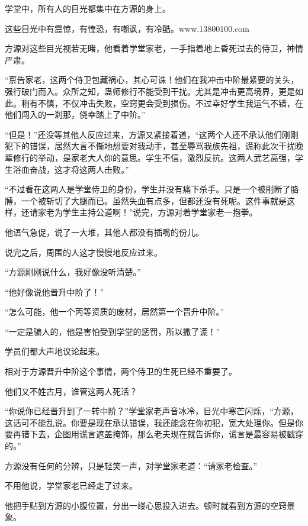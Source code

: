 
\begin{this_body}

学堂中，所有人的目光都集中在方源的身上。

这些目光中有震惊，有惶恐，有嘲讽，有冷酷。www.13800100.com

方源对这些目光视若无睹，他看着学堂家老，一手指着地上昏死过去的侍卫，神情严肃。

“禀告家老，这两个侍卫包藏祸心，其心可诛！他们在我冲击中阶最紧要的关头，强行破门而入。众所之知，蛊师修行不能受到干扰。尤其是冲击更高境界，更是如此。稍有不慎，不仅冲击失败，空窍更会受到损伤。不过幸好学生我运气不错，在他们闯入的一刹那，侥幸踏上了中阶。”

“但是！”还没等其他人反应过来，方源又紧接着道，“这两个人还不承认他们刚刚犯下的错误，居然大言不惭地想要对我动手，甚至辱骂我族先祖，谎称此次干扰晚辈修行的举动，是家老大人你的意思。学生不信，激烈反抗。这两人武艺高强，学生浴血奋战，这才将这两人击败。”

“不过看在这两人是学堂侍卫的身份，学生并没有痛下杀手。只是一个被削断了胳膊，一个被斩切了大腿而已。虽然失血有点多，但都还没有死呢。这件事就是这样，还请家老为学生主持公道啊！”说完，方源对着学堂家老一抱拳。

他语气急促，说了一大堆，其他人都没有插嘴的份儿。

说完之后，周围的人这才慢慢地反应过来。

“方源刚刚说什么，我好像没听清楚。”

“他好像说他晋升中阶了！”

“怎么可能，他一个丙等资质的废材，居然第一个晋升中阶。”

“一定是骗人的，他是害怕受到学堂的惩罚，所以撒了谎！”

学员们都大声地议论起来。

相对于方源晋升中阶这个事情，两个侍卫的生死已经不重要了。

他们又不姓古月，谁管这两人死活？

“你说你已经晋升到了一转中阶？”学堂家老声音冰冷，目光中寒芒闪烁，“方源，这话可不能乱说。你要是现在承认错误，我还能念在你初犯，宽大处理你。但是你要再错下去，企图用谎言遮盖掩饰，那么老夫现在就告诉你，谎言是最容易被戳穿的。”

方源没有任何的分辨，只是轻笑一声，对学堂家老道：“请家老检查。”

不用他说，学堂家老已经走了过来。

他把手贴到方源的小腹位置，分出一缕心思投入进去。顿时就看到方源的空窍景象。


\end{this_body}
